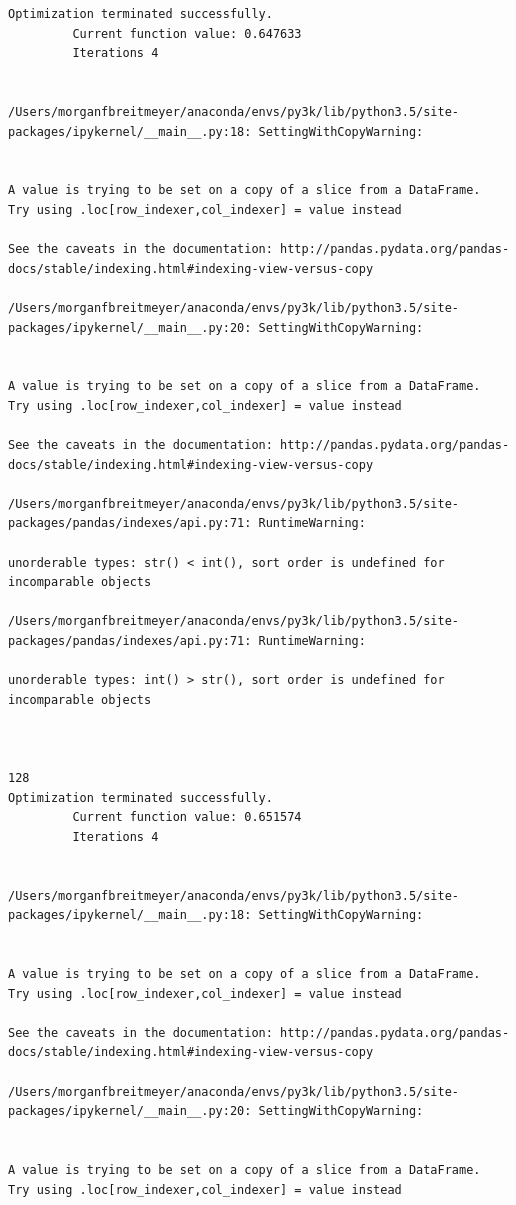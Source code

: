 \begin{lstlisting}
Optimization terminated successfully.
         Current function value: 0.647633
         Iterations 4


/Users/morganfbreitmeyer/anaconda/envs/py3k/lib/python3.5/site-packages/ipykernel/__main__.py:18: SettingWithCopyWarning:


A value is trying to be set on a copy of a slice from a DataFrame.
Try using .loc[row_indexer,col_indexer] = value instead

See the caveats in the documentation: http://pandas.pydata.org/pandas-docs/stable/indexing.html#indexing-view-versus-copy

/Users/morganfbreitmeyer/anaconda/envs/py3k/lib/python3.5/site-packages/ipykernel/__main__.py:20: SettingWithCopyWarning:


A value is trying to be set on a copy of a slice from a DataFrame.
Try using .loc[row_indexer,col_indexer] = value instead

See the caveats in the documentation: http://pandas.pydata.org/pandas-docs/stable/indexing.html#indexing-view-versus-copy

/Users/morganfbreitmeyer/anaconda/envs/py3k/lib/python3.5/site-packages/pandas/indexes/api.py:71: RuntimeWarning:

unorderable types: str() < int(), sort order is undefined for incomparable objects

/Users/morganfbreitmeyer/anaconda/envs/py3k/lib/python3.5/site-packages/pandas/indexes/api.py:71: RuntimeWarning:

unorderable types: int() > str(), sort order is undefined for incomparable objects



128
Optimization terminated successfully.
         Current function value: 0.651574
         Iterations 4


/Users/morganfbreitmeyer/anaconda/envs/py3k/lib/python3.5/site-packages/ipykernel/__main__.py:18: SettingWithCopyWarning:


A value is trying to be set on a copy of a slice from a DataFrame.
Try using .loc[row_indexer,col_indexer] = value instead

See the caveats in the documentation: http://pandas.pydata.org/pandas-docs/stable/indexing.html#indexing-view-versus-copy

/Users/morganfbreitmeyer/anaconda/envs/py3k/lib/python3.5/site-packages/ipykernel/__main__.py:20: SettingWithCopyWarning:


A value is trying to be set on a copy of a slice from a DataFrame.
Try using .loc[row_indexer,col_indexer] = value instead


\end{lstlisting}
